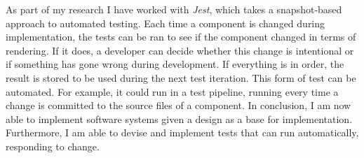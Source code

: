 As part of my research I have worked with \textit{Jest}, which takes a snapshot-based approach to automated testing. Each time a component is changed during implementation, the tests can be ran to see if the component changed in terms of rendering. If it does, a developer can decide whether this change is intentional or if something has gone wrong during development. If everything is in order, the result is stored to be used during the next test iteration. This form of test can be automated. For example, it could run in a test pipeline, running every time a change is committed to the source files of a component.
\newline
In conclusion, I am now able to implement software systems given a design as a base for implementation. Furthermore, I am able to devise and implement tests that can run automatically, responding to change.